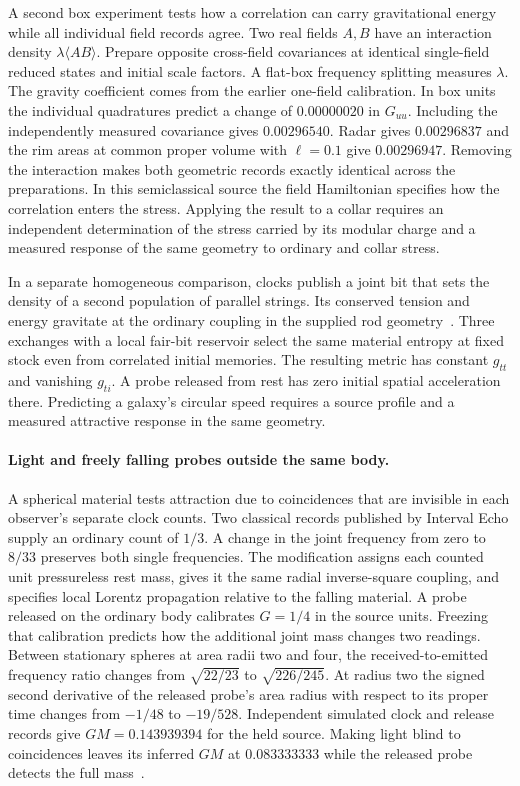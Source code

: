 \documentclass[11pt]{article}
\begin{document}
A second box experiment tests how a correlation can carry gravitational
energy while all individual field records agree. Two real fields $A,B$ have
an interaction density $\lambda\langle AB\rangle$. Prepare opposite
cross-field covariances at identical single-field reduced states and
initial scale factors. A flat-box frequency splitting measures $\lambda$.
The gravity coefficient comes from the earlier one-field calibration. In
box units the individual quadratures predict a change of $0.00000020$ in
$G_{uu}$. Including the independently measured covariance gives
$0.00296540$. Radar gives $0.00296837$ and the rim areas at common proper
volume with $\ell=0.1$ give $0.00296947$. Removing the interaction makes
both geometric records exactly identical across the preparations. In this
semiclassical source the field Hamiltonian specifies how the correlation
enters the stress. Applying the result to a collar requires an independent
determination of the stress carried by its modular charge and a measured
response of the same geometry to ordinary and collar stress.

In a separate homogeneous comparison, clocks publish a joint bit that
sets the density of a second population of parallel strings. Its conserved
tension and energy gravitate at the ordinary coupling in the supplied
rod geometry~\cite{ophEinstein}. Three exchanges with a local fair-bit
reservoir select the same material entropy at fixed stock even from
correlated initial memories. The resulting metric has constant
$g_{tt}$ and vanishing $g_{ti}$. A probe released from rest has zero
initial spatial acceleration there. Predicting a galaxy's circular
speed requires a source profile and a measured attractive response
in the same geometry.

\paragraph{Light and freely falling probes outside the same body.}
A spherical material tests attraction due to coincidences that are
invisible in each observer's separate clock counts. Two classical
records published by Interval Echo supply an ordinary count of $1/3$.
A change in the joint frequency from zero to $8/33$ preserves both
single frequencies. The modification assigns each counted unit
pressureless rest mass, gives it the same radial inverse-square
coupling, and specifies local Lorentz propagation relative to the
falling material. A probe released on the ordinary body calibrates
$G=1/4$ in the source units. Freezing that calibration predicts how
the additional joint mass changes two readings. Between stationary
spheres at area radii two and four, the received-to-emitted frequency
ratio changes from $\sqrt{22/23}$ to $\sqrt{226/245}$. At radius two
the signed second derivative of the released probe's area radius
with respect to its proper time changes from $-1/48$ to $-19/528$.
Independent simulated clock and release records give
$GM=0.143939394$ for the held source. Making light blind to coincidences
leaves its inferred $GM$ at $0.083333333$ while the released probe
detects the full mass~\cite{ophEinstein}.
\end{document}
